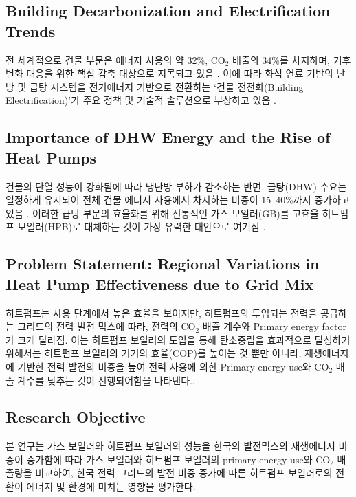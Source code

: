 \documentclass[final,5p,times,twocolumn,authoryear]{elsarticle}
\begin{document}

\subsection{Building Decarbonization and Electrification Trends}
전 세계적으로 건물 부문은 에너지 사용의 약 32\%, CO$_2$ 배출의 34\%를 차지하며, 기후 변화 대응을 위한 핵심 감축 대상으로 지목되고 있음 \cite{unep2024global}. 이에 따라 화석 연료 기반의 난방 및 급탕 시스템을 전기에너지 기반으로 전환하는 `건물 전전화(Building Electrification)'가 주요 정책 및 기술적 솔루션으로 부상하고 있음 \cite{irena2020renewable}.

\subsection{Importance of DHW Energy and the Rise of Heat Pumps}
건물의 단열 성능이 강화됨에 따라 냉난방 부하가 감소하는 반면, 급탕(DHW) 수요는 일정하게 유지되어 전체 건물 에너지 사용에서 차지하는 비중이 15--40\%까지 증가하고 있음 \cite{ref3, ref4}. 이러한 급탕 부문의 효율화를 위해 전통적인 가스 보일러(GB)를 고효율 히트펌프 보일러(HPB)로 대체하는 것이 가장 유력한 대안으로 여겨짐 \cite{ref3, ref5}.

\subsection{Problem Statement: Regional Variations in Heat Pump Effectiveness due to Grid Mix}
히트펌프는 사용 단계에서 높은 효율을 보이지만, 히트펌프의 투입되는 전력을 공급하는 그리드의 전력 발전 믹스에 따라, 전력의 CO$_2$ 배출 계수와  Primary energy factor가 크게 달라짐. 이는 히트펌프 보일러의 도입을 통해 탄소중립을 효과적으로 달성하기 위해서는 히트펌프 보일러의 기기의 효율(COP)를 높이는 것 뿐만 아니라, 재생에너지에 기반한 전력 발전의 비중을 높여 전력 사용에 의한 Primary energy use와 CO$_2$ 배출 계수를 낮추는 것이 선행되어함을 나타낸다.\cite{irena2020renewable}.

\subsection{Research Objective}
본 연구는 가스 보일러와 히트펌프 보일러의 성능을 한국의 발전믹스의 재생에너지 비중이 증가함에 따라 가스 보일러와 히트펌프 보일러의 primary energy use와 CO$_2$ 배출량을 비교하여, 한국 전력 그리드의 발전 비중 증가에 따른 히트펌프 보일러로의 전환이 에너지 및 환경에 미치는 영향을 평가한다. 
\end{document}
